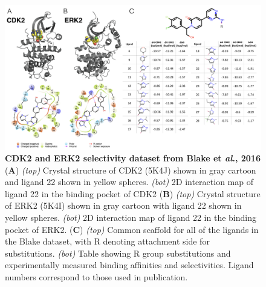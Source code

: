 \documentclass[9pt,lineno]{elife-modified} %
\begin{document}
\begin{figure}
\begin{fullwidth}
\begin{centering}
\includegraphics[width=1.0\linewidth]{figures/figure3.png}
\end{centering}
\caption{
\label{fig:figure-3}
{\bf CDK2 and ERK2 selectivity dataset from Blake et \emph{al}., 2016} \\
({\bf A})  \emph{(top)} Crystal structure of CDK2 (5K4J) shown in gray cartoon and ligand 22 shown in yellow spheres. \emph{(bot)} 2D interaction map of ligand 22 in the binding pocket of CDK2
({\bf B}) \emph{(top)} Crystal structure of ERK2 (5K4I) shown in gray cartoon with ligand 22 shown in yellow spheres. \emph{(bot)} 2D interaction map of ligand 22 in the binding pocket of ERK2.
({\bf C}) \emph{(top)} Common scaffold for all of the ligands in the Blake dataset, with R denoting attachment side for substitutions. \emph{(bot)} Table showing R group substitutions and experimentally measured binding affinities and selectivities. Ligand numbers correspond to those used in publication. 
}
\end{fullwidth}
\end{figure}
\end{document}
